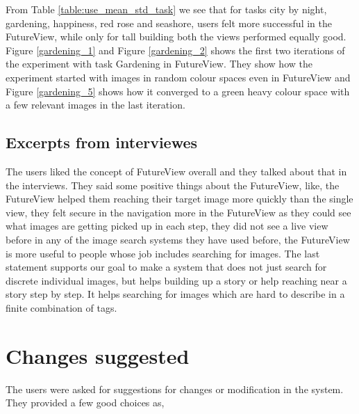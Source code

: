 \documentclass[english]{tktltiki}
\begin{document}
From Table \ref{table:use_mean_std_task} we see that for tasks city by night, gardening, happiness, red rose and seashore, users felt more successful in the FutureView, while only for tall building both the views performed equally good. Figure \ref{gardening_1} and Figure \ref{gardening_2} shows the first two iterations of the experiment with task Gardening in FutureView. They show how the experiment started with images in random colour spaces even in FutureView and Figure \ref{gardening_5} shows how it converged to a green heavy colour space with a few relevant images in the last iteration.

\subsection{Excerpts from interviewes}

The users liked the concept of FutureView overall and they talked about that in the interviews. They said some positive things about the FutureView, like, the FutureView helped them reaching their target image more quickly than the single view, they felt secure in the navigation more in the FutureView as they could see what images are getting picked up in each step, they did not see a live view before in any of the image search systems they have used before, the FutureView is more useful to people whose job includes searching for images. The last statement supports our goal to make a system that does not just search for discrete individual images, but helps building up a story or help reaching near a story step by step. It helps searching for images which are hard to describe in a finite combination of tags.

\section{Changes suggested}

The users were asked for suggestions for changes or modification in the system. They provided a few good choices as,
\end{document}
